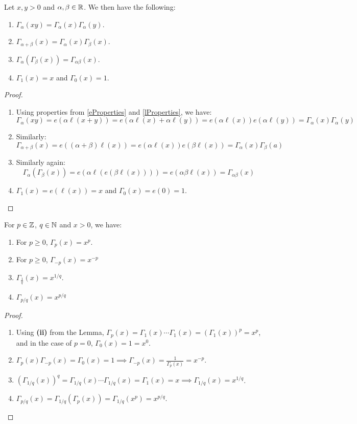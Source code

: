 \documentclass[../main.tex]{subfiles}
\begin{document}
\begin{lemma}
  Let $x, y > 0$ and $\alpha, \beta \in \mathbb{R}$.
  We then have the following:
  \begin{enumerate}
    \item $\Gamma_\alpha(xy) = \Gamma_{\alpha}(x)\Gamma_{\alpha}(y)$.
    \item $\Gamma_{\alpha + \beta}(x) = \Gamma_{\alpha}(x)\Gamma_{\beta}(x)$.
    \item $\Gamma_{\alpha}(\Gamma_{\beta}(x)) = \Gamma_{\alpha \beta}(x)$.
    \item $\Gamma_1(x) = x$ and $\Gamma_0(x) = 1$.
  \end{enumerate}
\end{lemma}
\begin{proof}
  \begin{enumerate}
    \item Using properties from \cref{eProperties} and \cref{lProperties}, we have:
      \[
        \Gamma_{\alpha}(xy) = e(\alpha\ell(x + y)) = e(\alpha\ell(x) + \alpha\ell(y)) = e(\alpha\ell(x))e(\alpha\ell(y)) = \Gamma_{\alpha}(x)\Gamma_{\alpha}(y)
      \]
    \item
      Similarly:
      \[
        \Gamma_{\alpha + \beta}(x) = e((\alpha + \beta)\ell(x)) = e(\alpha\ell(x))e(\beta\ell(x)) = \Gamma_{\alpha}(x)\Gamma_{\beta}(a)
      \]
    \item
      Similarly again:
      \[
        \Gamma_{\alpha}(\Gamma_{\beta}(x)) = e(\alpha \ell(e(\beta \ell(x)))) = e(\alpha \beta \ell(x)) = \Gamma_{\alpha \beta}(x)
      \]
    \item $\Gamma_{1}(x) = e(\ell(x)) = x$ and $\Gamma_{0}(x) = e(0) = 1$.
  \end{enumerate}
\end{proof}
\begin{corollary}
  For $p \in \mathbb{Z}$, $q \in \mathbb{N}$ and $x > 0$, we have:
  \begin{enumerate}
    \item For $p \geq 0$, $\Gamma_{p}(x) = x^{p}$.
    \item For $p \geq 0$, $\Gamma_{-p}(x) = x^{-p}$
    \item $\Gamma_{\frac{1}{q}}(x) = x^{1/q}$.
    \item $\Gamma_{p/q}(x) = x^{p/q}$
  \end{enumerate}
\end{corollary}
\begin{proof}
  \begin{enumerate}
    \item Using \textbf{(ii)} from the Lemma, $\Gamma_{p}(x) = \Gamma_{1}(x)  \cdots \Gamma_{1}(x) = (\Gamma_{1}(x))^{p} = x^{p}$, and in the case of $p = 0$, $\Gamma_{0}(x) = 1 = x^{0}$.
    \item $\Gamma_{p}(x)\Gamma_{-p}(x) = \Gamma_{0}(x) = 1 \implies \Gamma_{-p}(x) = \frac{1}{\Gamma_{p}(x)} = x^{-p}$.
    \item $(\Gamma_{1/q}(x))^{q} = \Gamma_{1/q}(x) \cdots \Gamma_{1/q}(x) = \Gamma_{1}(x) = x \implies \Gamma_{1/q}(x) = x^{1/q}$.
    \item $\Gamma_{p/q}(x) = \Gamma_{1/q}(\Gamma_{p}(x)) = \Gamma_{1/q}(x^{p}) = x^{p/q}$.
  \end{enumerate}
\end{proof}
\end{document}
